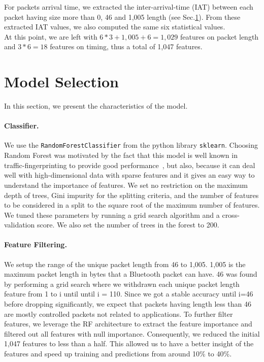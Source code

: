  For packets arrival time, we extracted the inter-arrival-time (IAT) between each packet having size more than 0, 46 and 1,005 length (see Sec.\ref{sec:model selection}). From these extracted IAT values, we also computed the same six statistical values.
 \\
 
 At this point, we are left with $6*3 + 1,005 + 6 = 1,029$ features on packet length and $3*6=18$ features on timing, thus a total of 1,047 features.
 \newpage



\section{Model Selection}
\label{sec:model selection}
In this section, we present the characteristics of the model.

\paragraph{Classifier.}
We use the \texttt{RandomForestClassifier} from the python library \texttt{sklearn}. Choosing Random Forest was motivated by the fact that this model is well known in traffic-fingerprinting to provide good performance~\cite{10.1145/3274694.3274697, k-fingerprinting, taylor2016appscanner}, but also, because it can deal well with high-dimensional data with sparse features and it gives an easy way to understand the importance of features. We set no restriction on the maximum depth of trees, Gini impurity for the splitting criteria, and the number of features to be considered in a split to the square root of the maximum number of features. We tuned these parameters by running a grid search algorithm and a cross-validation score. We also set the number of trees in the forest to 200.

\paragraph{Feature Filtering.} We setup the range of the unique packet length from 46 to 1,005. 1,005 is the maximum packet length in bytes that a Bluetooth packet can have. 46 was found by performing a grid search where we withdrawn each unique packet length feature from 1 to i until until i = 110. Since we got a stable accuracy until i=46 before dropping significantly, we expect that packets having length less than 46 are mostly controlled packets not related to applications. To further filter features, we leverage the RF architecture to extract the feature importance and filtered out all features with null importance. Consequently, we reduced the initial 1,047 features to less than a half. This allowed us to have a better insight of the features and speed up training and predictions from around 10\% to 40\%. 








